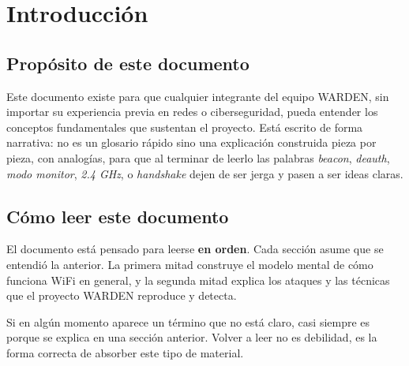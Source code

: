 \documentclass[11pt,a4paper]{article}
\begin{document}

\begin{wardenrevisions}
\end{wardenrevisions}

\tableofcontents
\newpage

\section{Introducción}

\subsection{Propósito de este documento}
Este documento existe para que cualquier integrante del equipo WARDEN, sin
importar su experiencia previa en redes o ciberseguridad, pueda entender los
conceptos fundamentales que sustentan el proyecto. Está escrito de forma
narrativa: no es un glosario rápido sino una explicación construida pieza
por pieza, con analogías, para que al terminar de leerlo las palabras
\emph{beacon}, \emph{deauth}, \emph{modo monitor}, \emph{2.4 GHz}, o
\emph{handshake} dejen de ser jerga y pasen a ser ideas claras.

\subsection{Cómo leer este documento}
El documento está pensado para leerse \textbf{en orden}. Cada sección asume
que se entendió la anterior. La primera mitad construye el modelo mental
de cómo funciona WiFi en general, y la segunda mitad explica los ataques y
las técnicas que el proyecto WARDEN reproduce y detecta.

Si en algún momento aparece un término que no está claro, casi siempre es
porque se explica en una sección anterior. Volver a leer no es debilidad,
es la forma correcta de absorber este tipo de material.
\end{document}
